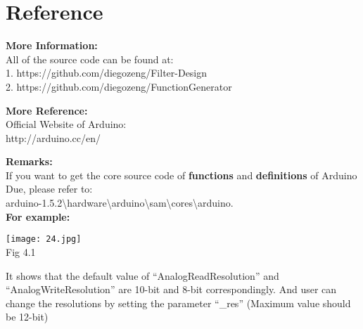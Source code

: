 \documentclass[12pt]{report}
\begin{document}
\chapter{\Large Reference}
\begin{flushleft}
\textbf{\large More Information:\\}
\vspace{3pt}
All of the source code can be found at:\\
1. https://github.com/diegozeng/Filter-Design\\
2. https://github.com/diegozeng/FunctionGenerator\\
\end{flushleft}
\vspace{20pt}
\begin{flushleft}
\textbf{\large More Reference:\\}
\vspace{3pt}
Official Website of Arduino:\\
http://arduino.cc/en/\\
\end{flushleft}
\vspace{20pt}
\begin{flushleft}
\textbf{\large Remarks:\\}
\vspace{3pt}
If you want to get the core source code of \textbf{functions} and \textbf{definitions} of Arduino Due, please refer to:\\
arduino-1.5.2\textbackslash hardware\textbackslash arduino\textbackslash sam\textbackslash cores\textbackslash arduino.\\
\textbf{For example:}\\
\begin{center}
\texttt{[image: 24.jpg]}\\
\textup{\footnotesize Fig 4.1}
\end{center}
\begin{flushleft}
It shows that the default value of ``AnalogReadResolution'' and ``AnalogWriteResolution'' are 10-bit and 8-bit correspondingly.
And user can change the resolutions by setting the parameter ``\_res'' (Maximum value should be 12-bit)
\end{flushleft}
\end{flushleft}
\end{document}
